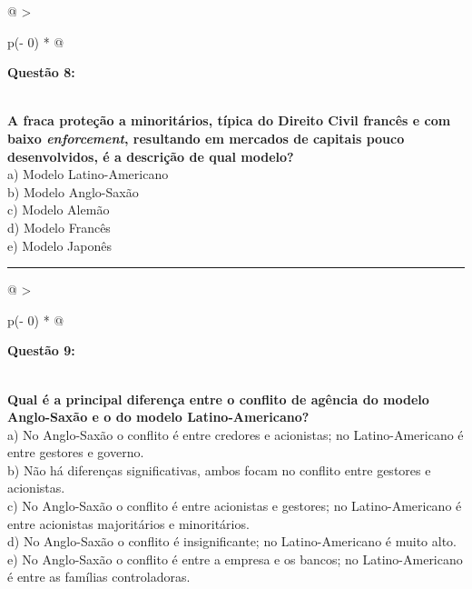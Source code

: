 \documentclass[
]{book}
\begin{document}
\begin{longtable}[]{@{}
  >{\raggedright\arraybackslash}p{(\columnwidth - 0\tabcolsep) * }@{}}
\toprule\noalign{}
\begin{minipage}[b]{\linewidth}\raggedright
\textbf{Questão 8:}
\end{minipage} \\
\midrule\noalign{}
\endhead
\bottomrule\noalign{}
\endlastfoot
\textbf{A fraca proteção a minoritários, típica do Direito Civil francês e com baixo \emph{enforcement}, resultando em mercados de capitais pouco desenvolvidos, é a descrição de qual modelo?} \\
a) Modelo Latino-Americano \\
b) Modelo Anglo-Saxão \\
c) Modelo Alemão \\
d) Modelo Francês \\
e) Modelo Japonês \\
\end{longtable}

\begin{center}\rule{0.5\linewidth}{0.5pt}\end{center}

\begin{longtable}[]{@{}
  >{\raggedright\arraybackslash}p{(\columnwidth - 0\tabcolsep) * }@{}}
\toprule\noalign{}
\begin{minipage}[b]{\linewidth}\raggedright
\textbf{Questão 9:}
\end{minipage} \\
\midrule\noalign{}
\endhead
\bottomrule\noalign{}
\endlastfoot
\textbf{Qual é a principal diferença entre o conflito de agência do modelo Anglo-Saxão e o do modelo Latino-Americano?} \\
a) No Anglo-Saxão o conflito é entre credores e acionistas; no Latino-Americano é entre gestores e governo. \\
b) Não há diferenças significativas, ambos focam no conflito entre gestores e acionistas. \\
c) No Anglo-Saxão o conflito é entre acionistas e gestores; no Latino-Americano é entre acionistas majoritários e minoritários. \\
d) No Anglo-Saxão o conflito é insignificante; no Latino-Americano é muito alto. \\
e) No Anglo-Saxão o conflito é entre a empresa e os bancos; no Latino-Americano é entre as famílias controladoras. \\
\end{longtable}
\end{document}
